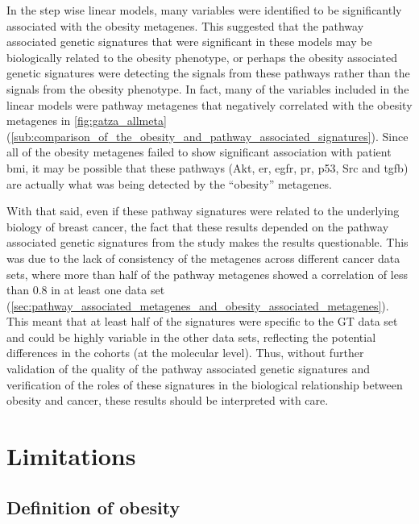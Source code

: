 In the step wise linear models, many variables were identified to be significantly associated with the obesity metagenes.
This suggested that the pathway associated genetic signatures that were significant in these models may be biologically related to the obesity phenotype, or perhaps the obesity associated genetic signatures were detecting the signals from these pathways rather than the signals from the obesity phenotype.
In fact, many of the variables included in the linear models were pathway metagenes that negatively correlated with the obesity metagenes in \cref{fig:gatza_allmeta} (\cref{sub:comparison_of_the_obesity_and_pathway_associated_signatures}).
Since all of the obesity metagenes failed to show significant association with patient \gls{bmi}, it may be possible that these pathways (Akt, \gls{er}, \gls{egfr}, \gls{pr}, p53, Src and \gls{tgfb}) are actually what was being detected by the ``obesity'' metagenes.

With that said, even if these pathway signatures were related to the underlying biology of breast cancer, the fact that these results depended on the pathway associated genetic signatures from the \citet{Gatza2010a} study makes the results questionable.
This was due to the lack of consistency of the metagenes across different cancer data sets, where more than half of the pathway metagenes showed a correlation of less than 0.8 in at least one data set (\cref{sec:pathway_associated_metagenes_and_obesity_associated_metagenes}).
This meant that at least half of the signatures were specific to the GT data set and could be highly variable in the other data sets, reflecting the potential differences in the cohorts (at the molecular level).
Thus, without further validation of the quality of the pathway associated genetic signatures and verification of the roles of these signatures in the biological relationship between obesity and cancer, these results should be interpreted with care.

\section{Limitations}
\label{sec:limitations}

\subsection{Definition of obesity}
\label{sub:discussion_definition_of_obesity}

